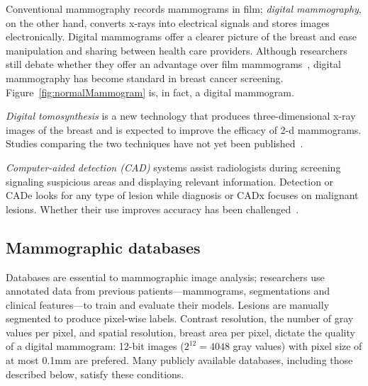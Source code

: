 Conventional mammography records mammograms in film; \emph{digital mammography}, on the other hand, converts x-rays into electrical signals and stores images electronically.
Digital mammograms offer a clearer picture of the breast and ease manipulation and sharing between health care providers.
Although researchers still debate whether they offer an advantage over film mammograms~\cite{Kerlikowske2011, Pisano2008, Skaane2007}, digital mammography has become standard in breast cancer screening. Figure~\ref{fig:normalMammogram} is, in fact, a digital mammogram.

\emph{Digital tomosynthesis} is a new technology that produces three-dimensional x-ray images of the breast and is expected to improve the efficacy of 2-d mammograms. Studies comparing the two techniques have not yet been published~\cite{NCI2014}.

\emph{Computer-aided detection (CAD)} systems assist radiologists during screening signaling suspicious areas and displaying relevant information. Detection or CADe looks for any type of lesion while diagnosis or CADx focuses on malignant lesions. Whether their use improves accuracy has been challenged~\cite{Lehman2015}.

\subsection{Mammographic databases}
Databases are essential to mammographic image analysis; researchers use annotated data from previous patients---mammograms, segmentations and clinical features---to train and evaluate their models. Lesions are manually segmented to produce pixel-wise labels. Contrast resolution, the number of gray values per pixel, and spatial resolution, breast area per pixel, dictate the quality of a digital mammogram: 12-bit images ($2^{12} = 4048$ gray values) with pixel size of at most 0.1mm are prefered. Many publicly available databases, including those described below, satisfy these conditions.

